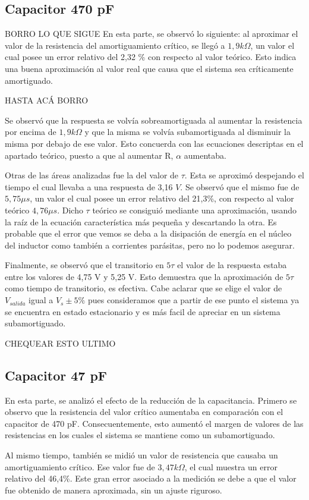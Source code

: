 \documentclass{article}
\begin{document}
        \subsection*{Capacitor 470 pF}
        BORRO LO QUE SIGUE
        	En esta parte, se observó lo siguiente: al aproximar el valor de la resistencia del 
            amortiguamiento crítico, se llegó a $1,9 k\Omega$, un valor el cual posee un error 
            relativo del 2,32 \% 
            con respecto al valor teórico. Esto indica una buena aproximación al valor real que
             causa que el sistema sea críticamente amortiguado. \par
        HASTA ACÁ BORRO \par
	Se observó que la respuesta se volvía sobreamortiguada al aumentar la resistencia
     por encima de $1,9 k\Omega$ y que la misma se volvía subamortiguada al disminuir la misma por 
     debajo de ese valor. Esto concuerda con las ecuaciones descriptas en el apartado teórico, puesto 
     a que al aumentar R, $\alpha$ aumentaba. \par
	Otras de las áreas analizadas fue la del valor de $\tau$. Esta se aproximó despejando el tiempo 
    el cual llevaba a una respuesta de 3,16 $V$. Se observó que el mismo fue de $5,75 \mu s$, un valor
     el cual posee un error relativo del 21,3\%, con respecto al valor teórico $4,76 \mu s$. Dicho $\tau$
      teórico se consiguió mediante una aproximación, usando la raíz de la ecuación característica más pequeña 
      y descartando la otra. Es probable que el error que vemos se deba a la disipación de energía en el núcleo del inductor como también a corrientes parásitas, pero no lo podemos asegurar.\par
	Finalmente, se observó que el transitorio en $5\tau$ el valor de la respuesta estaba entre los
     valores de 4,75 V y 5,25 V. Esto demuestra que la aproximación de $5\tau$ como tiempo de 
     transitorio, es efectiva. Cabe aclarar que se elige el valor de $V_{salida}$ igual a $V_s \pm 5\%$ pues 
     consideramos que a partir de ese punto el sistema ya se encuentra en estado estacionario y es más facil de apreciar en un sistema subamortiguado.  \par CHEQUEAR ESTO ULTIMO 
	
	
        \subsection*{Capacitor 47 pF}
        En esta parte, se analizó el efecto de la reducción de la capacitancia. Primero se observo que la resistencia del valor crítico aumentaba en comparación con el capacitor de 470 pF. Consecuentemente, esto aumentó el margen de valores de las resistencias en los cuales el sistema se mantiene como un subamortiguado.\par
        Al mismo tiempo, también se midió un valor de resistencia que causaba un amortiguamiento crítico. Ese valor fue de $3,47 k\Omega$, el cual muestra un error relativo del 46,4\%. Este gran error asociado a la medición se debe a que el valor fue obtenido de manera aproximada, sin un ajuste riguroso.\par 
        
\end{document}
